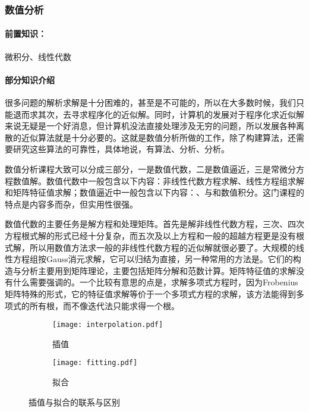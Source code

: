 \subsubsection{数值分析}

\paragraph{前置知识：}微积分、线性代数

\paragraph{部分知识介绍}

很多问题的解析求解是十分困难的，甚至是不可能的，所以在大多数时候，我们只能退而求其次，去寻求程序化的近似解。同时，计算机的发展对于程序化求近似解来说无疑是一个好消息，但计算机没法直接处理涉及无穷的问题，所以发展各种离散的近似算法就是十分必要的。这就是数值分析所做的工作，除了构建算法，还需要研究这些算法的可靠性，具体地说，有算法、分析、分析。

数值分析课程大致可以分成三部分，一是数值代数，二是数值逼近，三是常微分方程数值解。数值代数中一般包含以下内容：非线性代数方程求解、线性方程组求解和矩阵特征值求解；数值逼近中一般包含以下内容：、与和数值积分。这门课程的特点是内容多而杂，但实用性很强。

数值代数的主要任务是解方程和处理矩阵。首先是解非线性代数方程，三次、四次方程根式解的形式已经十分复杂，而五次及以上方程和一般的超越方程更是没有根式解，所以用数值方法求一般的非线性代数方程的近似解就很必要了。大规模的线性方程组按Gauss消元求解，它可以归结为直接，另一种常用的方法是。它们的构造与分析主要用到矩阵理论，主要包括矩阵分解和范数计算。矩阵特征值的求解没有什么需要强调的。一个比较有意思的点是，求解多项式方程时，因为Frobenius矩阵特殊的形式，它的特征值求解等价于一个多项式方程的求解，该方法能得到多项式的所有根，而不像迭代法只能求得一个根。


\begin{figure}[ht]
    \centering
    \begin{subfigure}[t]{0.45\textwidth}\centering
        \texttt{[image: interpolation.pdf]}
        \caption{插值}
    \end{subfigure}
    \begin{subfigure}[t]{0.45\textwidth}\centering
        \texttt{[image: fitting.pdf]}
        \caption{拟合}
    \end{subfigure}
    \caption{插值与拟合的联系与区别}
\end{figure}

